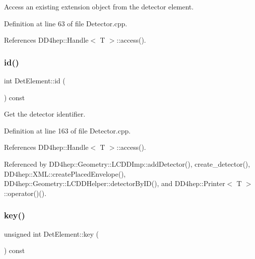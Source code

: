 Access an existing extension object from the detector element. 



Definition at line 63 of file Detector.\+cpp.



References D\+D4hep\+::\+Handle$<$ T $>$\+::access().

\hypertarget{class_d_d4hep_1_1_geometry_1_1_det_element_a7996df1e7f9605cb7e4ee8eae80adca3}{}\label{class_d_d4hep_1_1_geometry_1_1_det_element_a7996df1e7f9605cb7e4ee8eae80adca3} 
\subsubsection{\texorpdfstring{id()}{id()}}
{\footnotesize\ttfamily int Det\+Element\+::id (\begin{DoxyParamCaption}{ }\end{DoxyParamCaption}) const}



Get the detector identifier. 



Definition at line 163 of file Detector.\+cpp.



References D\+D4hep\+::\+Handle$<$ T $>$\+::access().



Referenced by D\+D4hep\+::\+Geometry\+::\+L\+C\+D\+D\+Imp\+::add\+Detector(), create\+\_\+detector(), D\+D4hep\+::\+X\+M\+L\+::create\+Placed\+Envelope(), D\+D4hep\+::\+Geometry\+::\+L\+C\+D\+D\+Helper\+::detector\+By\+I\+D(), and D\+D4hep\+::\+Printer$<$ T $>$\+::operator()().

\hypertarget{class_d_d4hep_1_1_geometry_1_1_det_element_a56e60c088beb44d273156bdef726580e}{}\label{class_d_d4hep_1_1_geometry_1_1_det_element_a56e60c088beb44d273156bdef726580e} 
\subsubsection{\texorpdfstring{key()}{key()}}
{\footnotesize\ttfamily unsigned int Det\+Element\+::key (\begin{DoxyParamCaption}{ }\end{DoxyParamCaption}) const}



